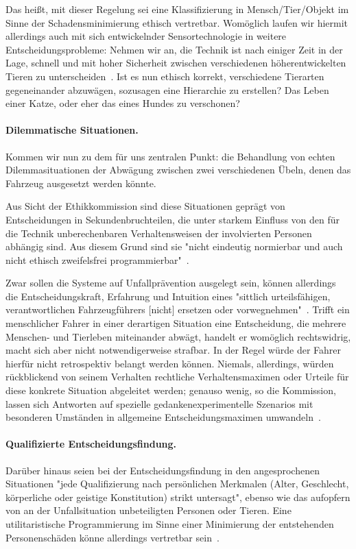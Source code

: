 \documentclass[twocolumn, german]{tum-article}
\begin{document}
Das heißt, mit dieser Regelung sei eine Klassifizierung in Mensch/Tier/Objekt im Sinne der Schadensminimierung ethisch vertretbar.
Womöglich laufen wir hiermit allerdings auch mit sich entwickelnder Sensortechnologie in weitere Entscheidungsprobleme:
Nehmen wir an, die Technik ist nach einiger Zeit in der Lage, schnell und mit hoher Sicherheit zwischen verschiedenen höherentwickelten Tieren zu unterscheiden~\cite[S. 551f.]{ethics-code}.
Ist es nun ethisch korrekt, verschiedene Tierarten gegeneinander abzuwägen, sozusagen eine Hierarchie zu erstellen? Das Leben einer Katze, oder eher das eines Hundes zu verschonen?

\paragraph{Dilemmatische Situationen.}
Kommen wir nun zu dem für uns zentralen Punkt: die Behandlung von echten Dilemmasituationen der Abwägung zwischen zwei verschiedenen Übeln, denen das Fahrzeug ausgesetzt werden könnte.

Aus Sicht der Ethikkommission sind diese Situationen geprägt von Entscheidungen in Sekundenbruchteilen, die unter starkem Einfluss von den für die Technik unberechenbaren Verhaltensweisen der involvierten Personen abhängig sind.
Aus diesem Grund sind sie "nicht eindeutig normierbar und auch nicht ethisch zweifelsfrei programmierbar"~\cite[S. 11]{ethik-komission}.

Zwar sollen die Systeme auf Unfallprävention ausgelegt sein, können allerdings die Entscheidungskraft, Erfahrung und Intuition eines "sittlich urteilsfähigen, verantwortlichen Fahrzeugführers [nicht] ersetzen oder vorwegnehmen"~\cite[S. 11]{ethik-komission}.
Trifft ein menschlicher Fahrer in einer derartigen Situation eine Entscheidung, die mehrere Menschen- und Tierleben miteinander abwägt, handelt er womöglich rechtswidrig, macht sich aber nicht notwendigerweise strafbar.
In der Regel würde der Fahrer hierfür nicht retrospektiv belangt werden können.
Niemals, allerdings, würden rückblickend von seinem Verhalten rechtliche Verhaltensmaximen oder Urteile für diese konkrete Situation abgeleitet werden;
genauso wenig, so die Kommission, lassen sich Antworten auf spezielle gedankenexperimentelle Szenarios mit besonderen Umständen in allgemeine Entscheidungsmaximen umwandeln~\cite[S. 11]{ethik-komission}.

\paragraph{Qualifizierte Entscheidungsfindung.}
Darüber hinaus seien bei der Entscheidungsfindung in den angesprochenen Situationen "jede Qualifizierung nach persönlichen Merkmalen (Alter, Geschlecht, körperliche oder geistige Konstitution) strikt untersagt", ebenso wie das aufopfern von an der Unfallsituation unbeteiligten Personen oder Tieren.
Eine utilitaristische Programmierung im Sinne einer Minimierung der entstehenden Personenschäden könne allerdings vertretbar sein~\cite[S. 11]{ethik-komission}.
\end{document}
